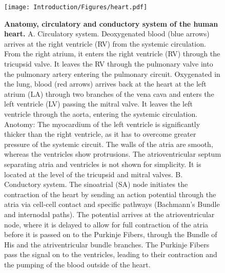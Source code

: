 \begin{figure}[htbp]
	\centering
	\texttt{[image: Introduction/Figures/heart.pdf]}
	\caption[\textbf{Anatomy, circulatory and conductory system of the human heart. }]{\textbf{Anatomy, circulatory and conductory system of the human heart. }A. Circulatory system. Deoxygenated blood (blue arrows) arrives at the right ventricle (RV) from the systemic circulation. From the right atrium, it enters the right ventricle (RV) through the tricupsid valve. It leaves the RV through the pulmonary valve into the pulmonary artery entering the pulmonary circuit. Oxygenated in the lung, blood (red arrows) arrives back at the heart at the left atrium (LA) through two branches of the vena cava and enters the left ventricle (LV) passing the mitral valve. It leaves the left ventricle through the aorta, entering the systemic circulation. Anotomy: The myocardium of the left ventricle is significantly thicker than the right ventricle, as it has to overcome greater pressure of the systemic circuit. The walls of the atria are smooth, whereas the ventricles show protrusions. The atrioventricular septum separating atria and ventricles is not shown for simplicity. It is located at the level of the tricupsid and mitral valves. B. Conductory system. The sinoatrial (SA) node initiates the contraction of the heart by sending an action potential through the atria via cell-cell contact and specific pathways (Bachmann's Bundle and internodal paths). The potential arrives at the atrioventricular node, where it is delayed to allow for full contraction of the atria before it is passed on to the Purkinje Fibers, through the Bundle of His and the atriventricular bundle branches. The Purkinje Fibers pass the signal on to the ventricles, leading to their contraction and the pumping of the blood outside of the heart. } 
	 	\label{fig:heart}
\end{figure}
%
 

